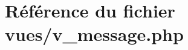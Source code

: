 \hypertarget{v__message_8php}{}\section{Référence du fichier vues/v\+\_\+message.php}
\label{v__message_8php}

